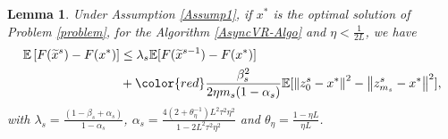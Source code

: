 \documentclass[10pt, conference, compsocconf]{IEEEtran}
\newcommand*{\E}{\mathbb{E}}
\newcommand{\norm}[1]{\left\lVert#1\right\rVert}
\newtheorem{lemma}[theorem]{Lemma}
\theoremstyle{definition}
\theoremstyle{remark}
\begin{document}
\begin{lemma}\label{lemma1}
Under Assumption \ref{Assump1}, if $x^*$ is the optimal solution of Problem \eqref{problem}, for the Algorithm \ref{AsyncVR-Algo} and $\eta < \frac{1}{2L}$, we have 
\begin{equation}
\begin{split}
\E\left[ F(\widetilde{x}^s) - F(x^*)\right] &\leq \lambda_s\E[F(\widetilde{x}^{s-1}) - F(x^*)]\\
&+{\color{red}\frac{\beta_s^2}{2\eta m_s(1-\alpha_s)}}\E[\norm{z_{0}^s-x^*}^2-\norm{z_{m_s}^s-x^*}^2 ],
\end{split}
\end{equation}
with $\lambda_s = \frac{(1-\beta_s+\alpha_s)}{1-\alpha_s}$, $\alpha_s=\frac{4(2+\theta_{\eta}^{-1})L^2\tau^2\eta^2}{1-2L^2 \tau^2\eta^2}$ and $\theta_{\eta} = \frac{1-\eta L}{\eta L}$.
\end{lemma}
\end{document}

